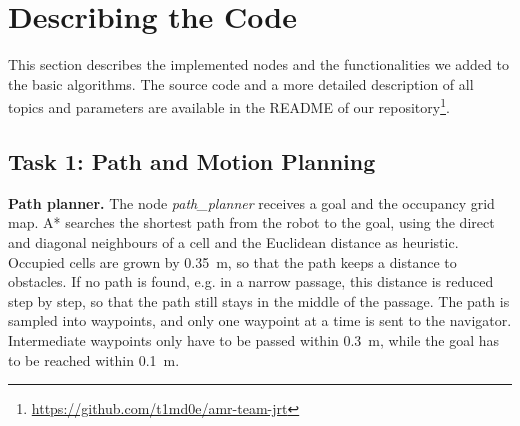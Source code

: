 \documentclass[../report.tex]{subfiles}
\begin{document}
    \section{Describing the Code}
    \label{sec:describing_code}


    This section describes the implemented nodes and the functionalities we added to the basic algorithms.
    The source code and a more detailed description of all topics and parameters are available in the README of our repository\footnote{\url{https://github.com/t1md0e/amr-team-jrt}}.

    \subsection{Task 1: Path and Motion Planning}
    \label{sec:describing_code:task1}

    \textbf{Path planner.}
    The node \emph{path\_planner} receives a goal and the occupancy grid map.
    A* searches the shortest path from the robot to the goal, using the direct and diagonal neighbours of a cell and the Euclidean distance as heuristic.
    Occupied cells are grown by \SI{0.35}{m}, so that the path keeps a distance to obstacles.
    If no path is found, e.g. in a narrow passage, this distance is reduced step by step, so that the path still stays in the middle of the passage.
    The path is sampled into waypoints, and only one waypoint at a time is sent to the navigator.
    Intermediate waypoints only have to be passed within \SI{0.3}{m}, while the goal has to be reached within \SI{0.1}{m}.
\end{document}

